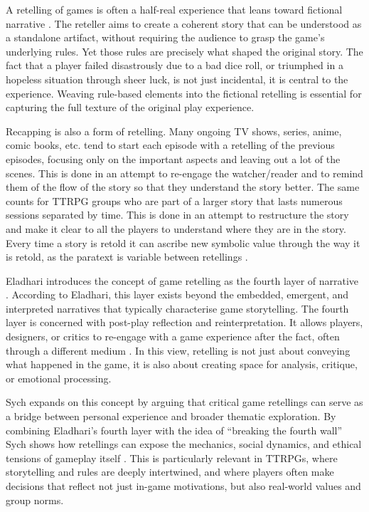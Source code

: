 A retelling of games is often a half-real experience that leans toward fictional narrative \cite{juul2011half}. The reteller aims to create a coherent story that can be understood as a standalone artifact, without requiring the audience to grasp the game's underlying rules. Yet those rules are precisely what shaped the original story. The fact that a player failed disastrously due to a bad dice roll, or triumphed in a hopeless situation through sheer luck, is not just incidental, it is central to the experience. Weaving rule-based elements into the fictional retelling is essential for capturing the full texture of the original play experience.

Recapping is also a form of retelling. Many ongoing TV shows, series, anime, comic books, etc. tend to start each episode with a retelling of the previous episodes, focusing only on the important aspects and leaving out a lot of the scenes. This is done in an attempt to re-engage the watcher/reader and to remind them of the flow of the story so that they understand the story better. The same counts for TTRPG groups who are part of a larger story that lasts numerous sessions separated by time. This is done in an attempt to restructure the story and make it clear to all the players to understand where they are in the story. Every time a story is retold it can ascribe new symbolic value through the way it is retold, as the paratext is variable between retellings \cite{gray2010show}.

Eladhari introduces the concept of game retelling as the fourth layer of narrative \cite{eladhari2018}. According to Eladhari, this layer exists beyond the embedded, emergent, and interpreted narratives that typically characterise game storytelling. The fourth layer is concerned with post-play reflection and reinterpretation. It allows players, designers, or critics to re-engage with a game experience after the fact, often through a different medium \cite{eladhari2018}. In this view, retelling is not just about conveying what happened in the game, it is also about creating space for analysis, critique, or emotional processing.

Sych expands on this concept by arguing that critical game retellings can serve as a bridge between personal experience and broader thematic exploration. By combining Eladhari's fourth layer with the idea of “breaking the fourth wall” Sych shows how retellings can expose the mechanics, social dynamics, and ethical tensions of gameplay itself \cite{sych2020}. This is particularly relevant in TTRPGs, where storytelling and rules are deeply intertwined, and where players often make decisions that reflect not just in-game motivations, but also real-world values and group norms.

